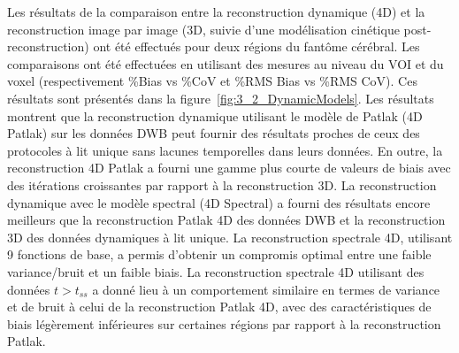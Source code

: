 Les résultats de la comparaison entre la reconstruction dynamique (4D) et la reconstruction image par image (3D, suivie d'une modélisation cinétique post-reconstruction) ont été effectués pour deux régions du fantôme cérébral. Les comparaisons ont été effectuées en utilisant des mesures au niveau du VOI et du voxel (respectivement \%Bias vs \%CoV et \%RMS Bias vs \%RMS CoV). Ces résultats sont présentés dans la figure~\ref{fig:3_2_DynamicModels}.
Les résultats montrent que la reconstruction dynamique utilisant le modèle de Patlak (4D Patlak) sur les données DWB peut fournir des résultats proches de ceux des protocoles à lit unique sans lacunes temporelles dans leurs données. En outre, la reconstruction 4D Patlak a fourni une gamme plus courte de valeurs de biais avec des itérations croissantes par rapport à la reconstruction 3D. La reconstruction dynamique avec le modèle spectral (4D Spectral) a fourni des résultats encore meilleurs que la reconstruction Patlak 4D des données DWB et la reconstruction 3D des données dynamiques à lit unique. La reconstruction spectrale 4D, utilisant 9 fonctions de base, a permis d'obtenir un compromis optimal entre une faible variance/bruit et un faible biais. La reconstruction spectrale 4D utilisant des données $t > t_{ss}$ a donné lieu à un comportement similaire en termes de variance et de bruit à celui de la reconstruction Patlak 4D, avec des caractéristiques de biais légèrement inférieures sur certaines régions par rapport à la reconstruction Patlak.


